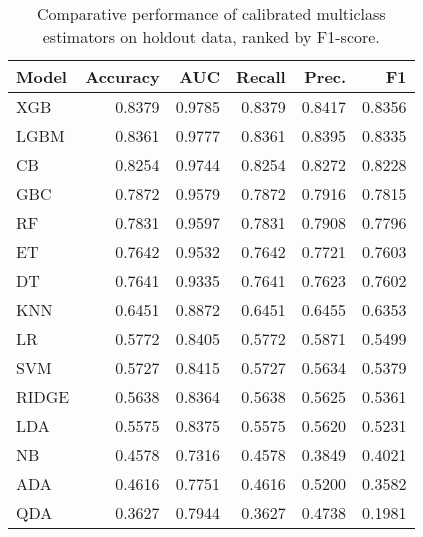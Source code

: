 \begin{table}
\caption{Comparative performance of calibrated multiclass estimators on holdout data, ranked by F1-score.}
\label{tbl:multiclass_ho_res_calibrated_models_df}
\begin{tabular}{lrrrrr}
\toprule
Model & Accuracy & AUC & Recall & Prec. & F1 \\
\midrule
XGB & 0.8379 & 0.9785 & 0.8379 & 0.8417 & 0.8356 \\
LGBM & 0.8361 & 0.9777 & 0.8361 & 0.8395 & 0.8335 \\
CB & 0.8254 & 0.9744 & 0.8254 & 0.8272 & 0.8228 \\
GBC & 0.7872 & 0.9579 & 0.7872 & 0.7916 & 0.7815 \\
RF & 0.7831 & 0.9597 & 0.7831 & 0.7908 & 0.7796 \\
ET & 0.7642 & 0.9532 & 0.7642 & 0.7721 & 0.7603 \\
DT & 0.7641 & 0.9335 & 0.7641 & 0.7623 & 0.7602 \\
KNN & 0.6451 & 0.8872 & 0.6451 & 0.6455 & 0.6353 \\
LR & 0.5772 & 0.8405 & 0.5772 & 0.5871 & 0.5499 \\
SVM & 0.5727 & 0.8415 & 0.5727 & 0.5634 & 0.5379 \\
RIDGE & 0.5638 & 0.8364 & 0.5638 & 0.5625 & 0.5361 \\
LDA & 0.5575 & 0.8375 & 0.5575 & 0.5620 & 0.5231 \\
NB & 0.4578 & 0.7316 & 0.4578 & 0.3849 & 0.4021 \\
ADA & 0.4616 & 0.7751 & 0.4616 & 0.5200 & 0.3582 \\
QDA & 0.3627 & 0.7944 & 0.3627 & 0.4738 & 0.1981 \\
\bottomrule
\end{tabular}
\end{table}
